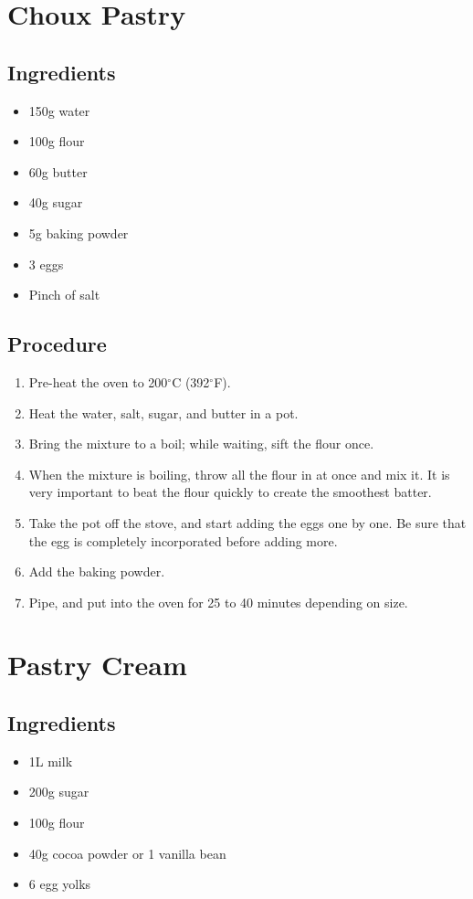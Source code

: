 \documentclass[10pt]{book}
\newcommand{\degree}{$^\circ$}
\begin{document}
\newpage\section*{Choux Pastry}
\subsection*{Ingredients}
	\begin{itemize}
		\item 150g water
		\item 100g flour
		\item 60g butter
		\item 40g sugar
		\item 5g baking powder
		\item 3 eggs
		\item Pinch of salt
	\end{itemize}
\subsection*{Procedure}
	\begin{enumerate}
		\item Pre-heat the oven to 200{\degree}C (392{\degree}F).
		\item Heat the water, salt, sugar, and butter in a pot.
		\item Bring the mixture to a boil; while waiting, sift the flour once.
		\item When the mixture is boiling, throw all the flour in at once and mix it.  It is very important to beat the flour quickly to create the smoothest batter.
		\item Take the pot off the stove, and start adding the eggs one by one.  Be sure that the egg is completely incorporated before adding more.
		\item Add the baking powder.
		\item Pipe, and put into the oven for 25 to 40 minutes depending on size.
	\end{enumerate}
	
\newpage\section*{Pastry Cream}
\subsection*{Ingredients}
	\begin{itemize}
		\item 1L milk
		\item 200g sugar
		\item 100g flour
		\item 40g cocoa powder or 1 vanilla bean
		\item 6 egg yolks
	\end{itemize}
\end{document}
